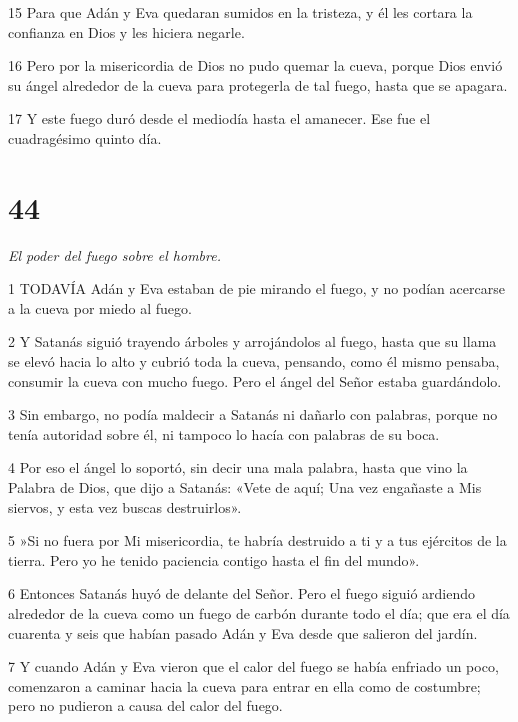 \par 15 Para que Adán y Eva quedaran sumidos en la tristeza, y él les cortara la confianza en Dios y les hiciera negarle.

\par 16 Pero por la misericordia de Dios no pudo quemar la cueva, porque Dios envió su ángel alrededor de la cueva para protegerla de tal fuego, hasta que se apagara.

\par 17 Y este fuego duró desde el mediodía hasta el amanecer. Ese fue el cuadragésimo quinto día.

\chapter{44}

\par \textit{El poder del fuego sobre el hombre.}

\par 1 TODAVÍA Adán y Eva estaban de pie mirando el fuego, y no podían acercarse a la cueva por miedo al fuego.

\par 2 Y Satanás siguió trayendo árboles y arrojándolos al fuego, hasta que su llama se elevó hacia lo alto y cubrió toda la cueva, pensando, como él mismo pensaba, consumir la cueva con mucho fuego. Pero el ángel del Señor estaba guardándolo.

\par 3 Sin embargo, no podía maldecir a Satanás ni dañarlo con palabras, porque no tenía autoridad sobre él, ni tampoco lo hacía con palabras de su boca.

\par 4 Por eso el ángel lo soportó, sin decir una mala palabra, hasta que vino la Palabra de Dios, que dijo a Satanás: «Vete de aquí; Una vez engañaste a Mis siervos, y esta vez buscas destruirlos».

\par 5 »Si no fuera por Mi misericordia, te habría destruido a ti y a tus ejércitos de la tierra. Pero yo he tenido paciencia contigo hasta el fin del mundo».

\par 6 Entonces Satanás huyó de delante del Señor. Pero el fuego siguió ardiendo alrededor de la cueva como un fuego de carbón durante todo el día; que era el día cuarenta y seis que habían pasado Adán y Eva desde que salieron del jardín.

\par 7 Y cuando Adán y Eva vieron que el calor del fuego se había enfriado un poco, comenzaron a caminar hacia la cueva para entrar en ella como de costumbre; pero no pudieron a causa del calor del fuego.

